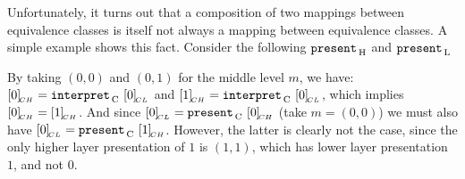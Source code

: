 Unfortunately, it turns out that a composition of two mappings between equivalence classes is itself not always a mapping between equivalence classes.  A simple example shows this fact. Consider the following ${\tt present}_{\, \mathrm H}$ and ${\tt present}_{\, \mathrm L}$






By taking $(0,0)$ and $(0,1)$ for the middle level $m$, we have: $[{0}]_{{\!_{CH}}} = {\tt interpret}_{\, \mathrm C}~[{0}]_{{\!_{CL}}}$ and $[{1}]_{{\!_{CH}}} = {\tt interpret}_{\, \mathrm C}~[{0}]_{{\!_{CL}}}$, which implies $[{0}]_{{\!_{CH}}} = [{1}]_{{\!_{CH}}}$. And since  $[{0}]_{{\!_{CL}}} = {\tt present}_{\, \mathrm C}~[{0}]_{{\!_{CH}}}$ (take $m = (0,0)$) we must also have $[{0}]_{{\!_{CL}}} = {\tt present}_{\, \mathrm C}~[{1}]_{{\!_{CH}}}$. However, the latter is clearly not the case, since the only higher layer presentation of $1$ is $(1,1)$, which has lower layer presentation $1$, and not $0$.




